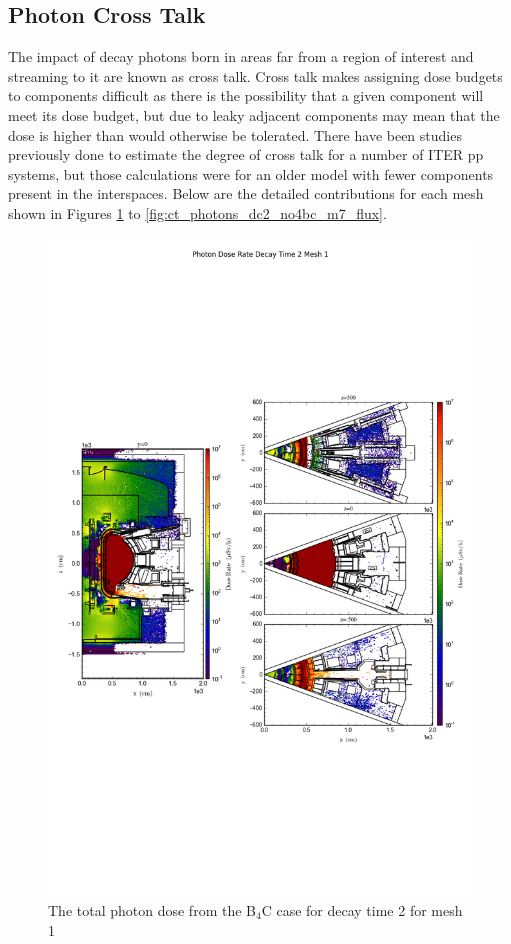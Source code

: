 \documentclass[12pt]{article}
\begin{document}
\subsection{Photon Cross Talk}
The impact of decay photons born in areas far from a region of interest and 
streaming to it are known as cross talk. Cross talk makes assigning dose 
budgets to components difficult as there is the possibility that a given 
component will meet its dose budget, but due to leaky adjacent components
may mean that the dose is higher than would otherwise be tolerated. There
have been studies previously done to estimate the degree of cross talk for
a number of ITER \gls{pp} systems, but those calculations were for an older
model with fewer components present in the interspaces. Below are the 
detailed contributions for each mesh shown in Figures 
\ref{fig:ct_photons_dc2_no4bc_m1_flux} to \ref{fig:ct_photons_dc2_no4bc_m7_flux}.

\begin{figure}[ht!]
\centering
\includegraphics[trim={0cm 9cm 0cm 10cm},clip,scale=0.75]{../plots/final_model/Photon_Dose_Rate_Decay_Time_2_Mesh_1.png}
\caption{The total photon dose from the B$_4$C case for decay time 2 for mesh 1}
\label{fig:ct_photons_dc2_no4bc_m1_flux}
\end{figure}
\end{document}
